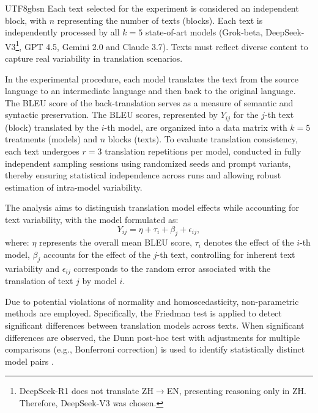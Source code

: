 \documentclass[conference]{IEEEtran}
\begin{document}
\begin{CJK}{UTF8}{gbsn}
Each text selected for the experiment is considered an independent block, with \( n \) representing the number of texts (blocks). Each text is independently processed by all \( k = 5 \) state-of-art models (Grok-beta, DeepSeek-V3\footnote{DeepSeek-R1 does not translate ZH$\rightarrow$EN, presenting reasoning only in ZH. Therefore, DeepSeek-V3 was chosen.}, GPT 4.5, Gemini 2.0 and Claude 3.7). Texts must reflect diverse content to capture real variability in translation scenarios.

In the experimental procedure, each model translates the text from the source language to an intermediate language and then back to the original language. The BLEU score of the back-translation serves as a measure of semantic and syntactic preservation. The BLEU scores, represented by \( Y_{ij} \) for the \( j \)-th text (block) translated by the \( i \)-th model, are organized into a data matrix with \( k = 5 \) treatments (models) and \( n \) blocks (texts). To evaluate translation consistency, each text undergoes \( r = 3 \) translation repetitions per model, conducted in fully independent sampling sessions using randomized seeds and prompt variants, thereby ensuring statistical independence across runs and allowing robust estimation of intra-model variability.


The analysis aims to distinguish translation model effects while accounting for text variability, with the model formulated as:
\begin{equation}
    Y_{ij} = \eta + \tau_i + \beta_j + \epsilon_{ij},
\end{equation}
where:
\( \eta \) represents the overall mean BLEU score, \( \tau_i \) denotes the effect of the \( i \)-th model, \( \beta_j \) accounts for the effect of the \( j \)-th text, controlling for inherent text variability and \( \epsilon_{ij} \) corresponds to the random error associated with the translation of text \( j \) by model \( i \).

Due to potential violations of normality and homoscedasticity, non-parametric methods are employed. Specifically, the Friedman test is applied to detect significant differences between translation models across texts. When significant differences are observed, the Dunn post-hoc test with adjustments for multiple comparisons (e.g., Bonferroni correction) is used to identify statistically distinct model pairs \cite{Sheldon1996, Aqmal2024, Arruda2020, Nam2015}.


\end{CJK}
\end{document}
